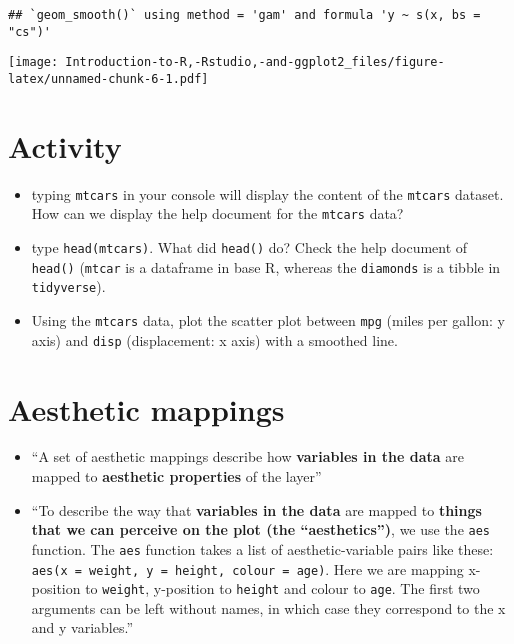 \documentclass[]{book}
\begin{document}
\begin{verbatim}
## `geom_smooth()` using method = 'gam' and formula 'y ~ s(x, bs = "cs")'
\end{verbatim}

\texttt{[image: Introduction-to-R,-Rstudio,-and-ggplot2\_files/figure-latex/unnamed-chunk-6-1.pdf]}

\section{Activity}\label{activity}

\begin{itemize}
\item
  typing \texttt{mtcars} in your console will display the content of the
  \texttt{mtcars} dataset. How can we display the help document for the
  \texttt{mtcars} data?
\item
  type \texttt{head(mtcars)}. What did \texttt{head()} do? Check the
  help document of \texttt{head()} (\texttt{mtcar} is a dataframe in
  base R, whereas the \texttt{diamonds} is a tibble in
  \texttt{tidyverse}).
\item
  Using the \texttt{mtcars} data, plot the scatter plot between
  \texttt{mpg} (miles per gallon: y axis) and \texttt{disp}
  (displacement: x axis) with a smoothed line.
\end{itemize}

\section{Aesthetic mappings}\label{aesthetic-mappings}

\begin{itemize}
\item
  ``A set of aesthetic mappings describe how \textbf{variables in the
  data} are mapped to \textbf{aesthetic properties} of the layer''
  \citep{ggplot2}
\item
  ``To describe the way that \textbf{variables in the data} are mapped
  to \textbf{things that we can perceive on the plot (the
  ``aesthetics'')}, we use the \texttt{aes} function. The \texttt{aes}
  function takes a list of aesthetic-variable pairs like these:
  \texttt{aes(x\ =\ weight,\ y\ =\ height,\ colour\ =\ age)}. Here we
  are mapping x-position to \texttt{weight}, y-position to
  \texttt{height} and colour to \texttt{age}. The first two arguments
  can be left without names, in which case they correspond to the x and
  y variables.'' \citep{ggplot2}
\end{itemize}
\end{document}
